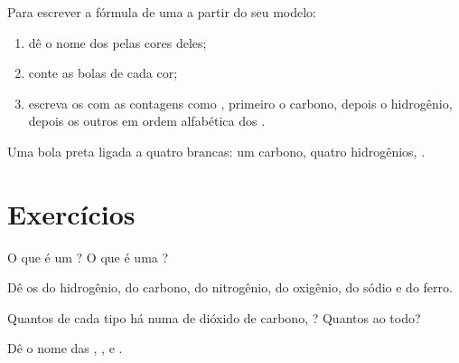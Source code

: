 \begin{method}\label{met:g7:atoms-and-molecules:model}
Para escrever a fórmula de uma  a partir do seu modelo:
\begin{enumerate}
  \item dê o nome dos  pelas cores deles;
  \item conte as bolas de cada cor;
  \item escreva os  com as contagens como , primeiro o
        carbono, depois o hidrogênio, depois os outros  em ordem
        alfabética dos .
\end{enumerate}
Uma bola preta ligada a quatro brancas: um carbono, quatro hidrogênios,
.
\end{method}

\section{Exercícios}

\begin{exercise}[$\star$]\label{exo:g7:atoms-and-molecules:1}
O que é um ? O que é uma ?
\end{exercise}

\begin{exercise}[$\star$]\label{exo:g7:atoms-and-molecules:2}
Dê os  do hidrogênio, do carbono, do nitrogênio, do oxigênio, do
sódio e do ferro.
\end{exercise}

\begin{exercise}[$\star$]\label{exo:g7:atoms-and-molecules:3}
Quantos  de cada tipo há numa  de dióxido de carbono,
? Quantos  ao todo?
\end{exercise}

\begin{exercise}[$\star$]\label{exo:g7:atoms-and-molecules:4}
Dê o nome das  , ,  e .
\end{exercise}


